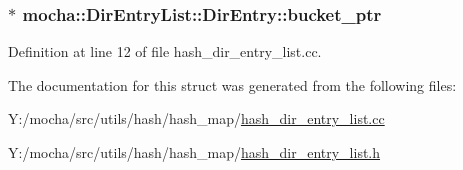 \hypertarget{structmocha_1_1_dir_entry_list_1_1_dir_entry_a1f99f0664a09b1f9077a2350e71972e6}{
\subsubsection[{bucket\_\-ptr}]{$\ast$ {\bf mocha::DirEntryList::DirEntry::bucket\_\-ptr}}}
\label{structmocha_1_1_dir_entry_list_1_1_dir_entry_a1f99f0664a09b1f9077a2350e71972e6}


Definition at line 12 of file hash\_\-dir\_\-entry\_\-list.cc.



The documentation for this struct was generated from the following files:\begin{DoxyCompactItemize}
\item 
Y:/mocha/src/utils/hash/hash\_\-map/\hyperlink{hash__dir__entry__list_8cc}{hash\_\-dir\_\-entry\_\-list.cc}\item 
Y:/mocha/src/utils/hash/hash\_\-map/\hyperlink{hash__dir__entry__list_8h}{hash\_\-dir\_\-entry\_\-list.h}\end{DoxyCompactItemize}
